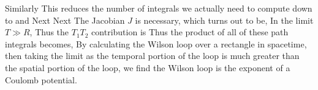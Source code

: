 \documentclass{article}
\begin{document}
Similarly
This reduces the number of integrals we actually need to compute down to
and
Next
Next
The Jacobian $J$ is necessary, which turns out to be,
In the limit $T\gg R$,
Thus the $T_1 T_2$ contribution is
Thus the product of all of these path integrals becomes,
By calculating the Wilson loop over a rectangle in spacetime, then taking the limit as the temporal portion of the loop is much greater than the spatial portion of the loop, we find the Wilson loop is the exponent of a Coulomb potential.
\end{document}
